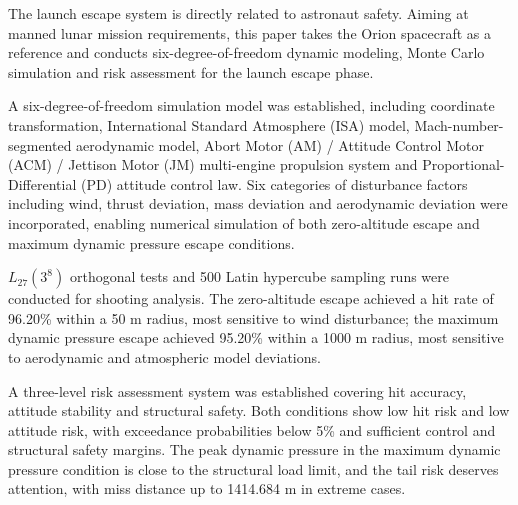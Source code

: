 \begin{engabstract}
    The launch escape system is directly related to astronaut safety. Aiming at manned lunar mission requirements, this paper takes the Orion spacecraft as a reference and conducts six-degree-of-freedom dynamic modeling, Monte Carlo simulation and risk assessment for the launch escape phase.

    A six-degree-of-freedom simulation model was established, including coordinate transformation, International Standard Atmosphere (ISA) model, Mach-number-segmented aerodynamic model, Abort Motor (AM) / Attitude Control Motor (ACM) / Jettison Motor (JM) multi-engine propulsion system and Proportional-Differential (PD) attitude control law. Six categories of disturbance factors including wind, thrust deviation, mass deviation and aerodynamic deviation were incorporated, enabling numerical simulation of both zero-altitude escape and maximum dynamic pressure escape conditions.

    $L_{27}(3^8)$ orthogonal tests and 500 Latin hypercube sampling runs were conducted for shooting analysis. The zero-altitude escape achieved a hit rate of 96.20\% within a 50 m radius, most sensitive to wind disturbance; the maximum dynamic pressure escape achieved 95.20\% within a 1000 m radius, most sensitive to aerodynamic and atmospheric model deviations.

    A three-level risk assessment system was established covering hit accuracy, attitude stability and structural safety. Both conditions show low hit risk and low attitude risk, with exceedance probabilities below 5\% and sufficient control and structural safety margins. The peak dynamic pressure in the maximum dynamic pressure condition is close to the structural load limit, and the tail risk deserves attention, with miss distance up to 1414.684 m in extreme cases.

\end{engabstract}
